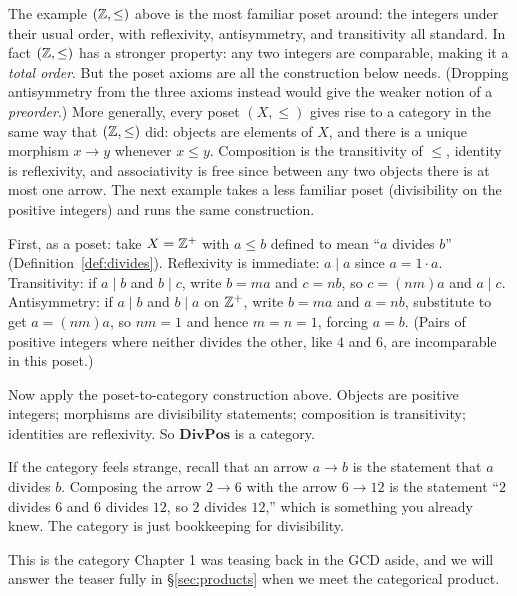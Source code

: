 \noindent The example $({\mathbb{Z}}, \leq)$ above is the most familiar poset around: the
integers under their usual order, with reflexivity, antisymmetry, and transitivity
all standard. In fact $({\mathbb{Z}}, \leq)$ has a stronger property: any two integers are
comparable, making it a \textit{total order}. But the poset
axioms are all the construction below needs. (Dropping antisymmetry from the
three axioms instead would give the weaker notion of a
\textit{preorder}.) More generally, every
poset $(X, \leq)$ gives rise to a category in the same way that $({\mathbb{Z}}, \leq)$
did: objects are elements of $X$, and there is a unique morphism $x \to y$
whenever $x \leq y$. Composition is the transitivity of $\leq$, identity is
reflexivity, and associativity is free since between any two objects there is
at most one arrow. The next example takes a less familiar poset (divisibility
on the positive integers) and runs the same construction.

\begin{example}
First, as a poset: take $X = {\mathbb{Z}}^+$ with $a \leq b$ defined to mean ``$a$ divides
$b$'' (Definition~\ref{def:divides}). Reflexivity is immediate: $a \mid a$ since
$a = 1 \cdot a$. Transitivity: if $a \mid b$ and $b \mid c$, write $b = ma$ and
$c = nb$, so $c = (nm)a$ and $a \mid c$. Antisymmetry: if $a \mid b$ and
$b \mid a$ on ${\mathbb{Z}}^+$, write $b = ma$ and $a = nb$, substitute to get
$a = (nm)a$, so $nm = 1$ and hence $m = n = 1$, forcing $a = b$. (Pairs of
positive integers where neither divides the other, like $4$ and $6$, are
incomparable in this poset.)

Now apply the poset-to-category construction above. Objects are positive
integers; morphisms are divisibility statements; composition is transitivity;
identities are reflexivity. So $\mathbf{DivPos}$ is a category.

If the category feels strange, recall that an arrow $a \to b$ is the statement
that $a$ divides $b$. Composing the arrow $2 \to 6$ with the arrow $6 \to 12$ is
the statement ``$2$ divides $6$ and $6$ divides $12$, so $2$ divides $12$,''
which is something you already knew. The category is just bookkeeping for
divisibility.

This is the category Chapter 1 was teasing back in the GCD aside, and we will
answer the teaser fully in \S\ref{sec:products} when we meet the categorical product.
\end{example}

